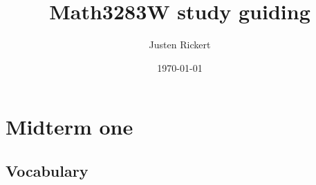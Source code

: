 \documentclass[12pt]{article}
\author{Justen Rickert}
\date{\today}
\title{Math3283W study guiding}
\begin{document}
\maketitle
\tableofcontents

\newcommand\bd[1]{\text{bd }#1}
\newcommand\cl[1]{\text{cl }#1}
\newcommand\int[1]{\text{int }#1}
\newcommand\lim[1]{\text{lim }#1}
\newcommand{\def}[1]{\textit{\textbf{#1}}}
\newcommand\abs[1]{\left|#1\right|}
\newcommand\deg{\textdegree}
\newcommand\Real{\mathbb{R}}
\newcommand\Natural{\mathbb{N}}
\newcommand\Rational{\mathbb{Q}}
\newcommand\sube{\subseteq}
\newcommand\supe{\supseteq}
\newcommand\sub{\subset}
\newcommand\sup{\supset}
\newcommand\setm{\setminus}
\newcommand\pr{\ensuremath{'}}
\newcommand\R{\mathcal{R}}
\newcommand\calR{\mathcal{R}}
\newcommand\calP{\mathcal{P}}
\newcommand\pow{\mathscr{P}}
\newcommand\indX{\mathscr{X}}
\newcommand\F{\mathscr{F}}
\newcommand\G{\mathscr{G}}
\newcommand\nil{\varnothing}

\theoremstyle{definition}
\newtheorem{definition}{Definition}
\renewcommand\qedsymbol{$\blacksquare$}

\newtheorem{lemma}[Theorem]{lemma}
\theoremstyle{definition}
\newtheorem{definition}{Def}[section]
\newtheorem*{remark}{Remark}
\newtheorem*{corollary}{Corollary}

\section{Midterm one}
\label{sec:org96a272d}
\subsection{Vocabulary}
\label{sec:org687136d}
\end{document}
